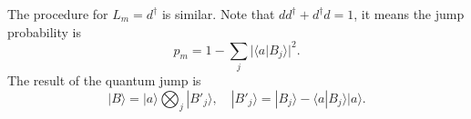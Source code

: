 \documentclass[aps,prb,superscriptaddress,nofootinbib]{revtex4}
\begin{document}
The procedure for $L_m = d^\dagger$ is similar.
Note that $dd^\dagger + d^\dagger d = 1$, it means the jump probability is 
\begin{equation}
	p_m = 1-\sum_j |\langle a|B_j\rangle|^2.
\end{equation}
The result of the quantum jump is
\begin{equation}
	|B\rangle = |a\rangle \bigotimes_{j}|B'_j\rangle,\quad
	|B'_{j}\rangle = |B_{j}\rangle - \langle a|B_{j}\rangle |a\rangle.
\end{equation}
\end{document}
